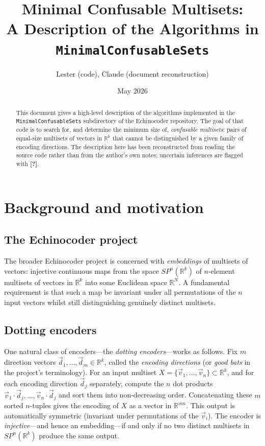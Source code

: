 \documentclass[12pt,a4paper]{article}
\title{Minimal Confusable Multisets:\\
A Description of the Algorithms in \texttt{MinimalConfusableSets}}
\author{Lester (code), Claude (document reconstruction)}
\date{May 2026}
\begin{document}
\maketitle

\begin{abstract}
This document gives a high-level description of the algorithms implemented in
the \texttt{MinimalConfusableSets} subdirectory of the Echinocoder repository.
The goal of that code is to search for, and determine the minimum size of,
\emph{confusable multisets}: pairs of equal-size multisets of vectors in
$\mathbb{R}^k$ that cannot be distinguished by a given family of encoding
directions. The description here has been reconstructed from reading the source
code rather than from the author's own notes; uncertain inferences are flagged
with \textbf{[?]}.
\end{abstract}

\tableofcontents
\newpage

\section{Background and motivation}
\label{sec:background}

\subsection*{The Echinocoder project}

The broader Echinocoder project is concerned with \emph{embeddings} of
multisets of vectors: injective continuous maps from the space
$SP^n(\mathbb{R}^k)$ of $n$-element multisets of vectors in $\mathbb{R}^k$
into some Euclidean space $\mathbb{R}^N$. A fundamental requirement is that
such a map be invariant under all permutations of the $n$ input vectors whilst
still distinguishing genuinely distinct multisets.

\subsection*{Dotting encoders}

One natural class of encoders---the \emph{dotting encoders}---works as follows.
Fix $m$ direction vectors $\vec{d}_1, \ldots, \vec{d}_m \in \mathbb{R}^k$,
called the \emph{encoding directions} (or \emph{good bats} in the project's
terminology). For an input multiset $X = \{\vec{v}_1, \ldots, \vec{v}_n\}
\subset \mathbb{R}^k$, and for each encoding direction $\vec{d}_j$ separately,
compute the $n$ dot products $\vec{v}_1\cdot\vec{d}_j,\ldots,
\vec{v}_n\cdot\vec{d}_j$ and sort them into non-decreasing order.
Concatenating these $m$ sorted $n$-tuples gives the encoding of $X$ as a
vector in $\mathbb{R}^{mn}$.  This output is automatically symmetric (invariant
under permutations of the $\vec{v}_i$).  The encoder is \emph{injective}---and
hence an embedding---if and only if no two distinct multisets in
$SP^n(\mathbb{R}^k)$ produce the same output.
\end{document}
